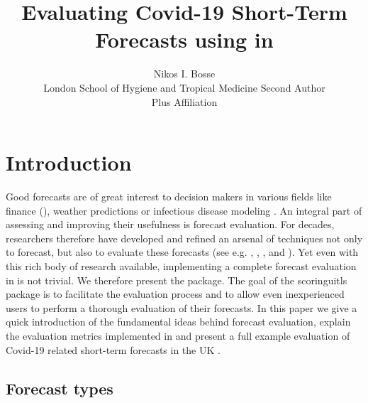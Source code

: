 \documentclass[article]{jss}
\author{Nikos I. Bosse\\London School of Hygiene and Tropical Medicine
   \And Second Author\\Plus Affiliation}
\title{Evaluating Covid-19 Short-Term Forecasts using \pkg{scoringutils} in \proglang{R}}
\begin{document}


\section[Introduction]{Introduction}
Good forecasts are of great interest to decision makers in various fields like finance (), weather predictions or infectious disease modeling \citep{funkShorttermForecastsInform2020}. An integral part of assessing and improving their usefulness is forecast evaluation. For decades, researchers therefore have developed and refined an arsenal of techniques not only to forecast, but also to evaluate these forecasts (see e.g. \cite{bracherEvaluatingEpidemicForecasts2020a}, \cite{FUNK}, \cite{gneitingProbabilisticForecastsCalibration2007}, and \cite{gneitingStrictlyProperScoring2007}). Yet even with this rich body of research available, implementing a complete forecast evaluation in  is not trivial. We therefore present the  package. The goal of the scoringuitls package is to facilitate the evaluation process and to allow even inexperienced users to perform a thorough evaluation of their forecasts. In this paper we give a quick introduction of the fundamental ideas behind forecast evaluation, explain the evaluation metrics implemented in  and present a full example evaluation of Covid-19 related short-term forecasts in the UK \citep{funkShorttermForecastsInform2020}. 

\subsection{Forecast types}
\end{document}
